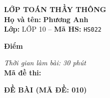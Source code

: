 \noindent
\begin{tcolorbox}[colback=white,colframe=black,arc=0mm,boxrule=0.8pt,top=4pt,bottom=4pt,left=6pt,right=6pt]
	\begin{minipage}[c]{0.44\textwidth}
		{\bfseries\large LỚP TOÁN THẦY THÔNG}\\[3pt]
		\textbf{Họ và tên:} \textbf{\large Phương Anh}\\[3pt]
		\textbf{Lớp:} LỚP 10 \quad -- \quad \textbf{Mã HS:} \texttt{HS022}
	\end{minipage}
	\hfill
	\begin{minipage}[c]{0.22\textwidth}
		\begin{tcolorbox}[colback=white,colframe=black,arc=0mm,boxrule=0.6pt,height=1.8cm,halign=center,valign=top,top=2pt]
			{\bfseries\normalsize Điểm}
		\end{tcolorbox}
	\end{minipage}
	\hfill
	\begin{minipage}[c]{0.30\textwidth}
		\raggedleft
		\textit{Thời gian làm bài: 30 phút}\\[4pt]
		\textbf{Mã đề thi:} 
	\end{minipage}
\end{tcolorbox}
\vspace{0.25cm}

\noindent\textbf{\large ĐỀ BÀI (MÃ ĐỀ: 010)}
\vspace{0.1cm}

